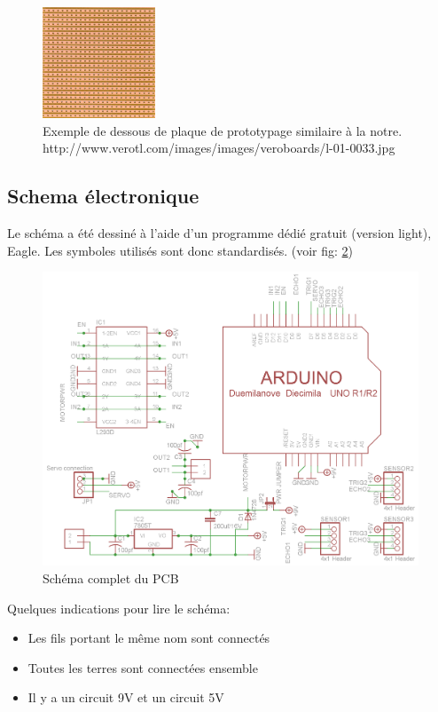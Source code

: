 \documentclass[a4paper,11pt]{report}
\begin{document}
{\begin{figure}[h]
\centering
\includegraphics[width=0.3\textwidth]{figures/StripBoard}
    \caption[Strip-	board]{\label{StripBoard}Exemple de dessous de plaque de prototypage
      similaire à la notre. http://www.verotl.com/images/images/veroboards/l-01-0033.jpg
    }
\end{figure}

\subsection{Schema électronique}
Le schéma a été dessiné à l'aide d'un programme dédié gratuit (version light),
Eagle. Les symboles utilisés sont donc standardisés.
(voir fig: \ref{schemaChineComplet})

\begin{figure}[h!]
\centering
\includegraphics[angle=90, width=1.1\textwidth]{figures/schema_CHI.png}
\caption{\label{schemaChineComplet}Schéma complet du PCB
}
\end{figure}

Quelques indications pour lire le schéma:

\begin{itemize}
\item Les fils portant le même nom sont connectés
\item Toutes les terres sont connectées ensemble
\item Il y a un circuit 9V et un circuit 5V
\end{itemize}

}
\end{document}
